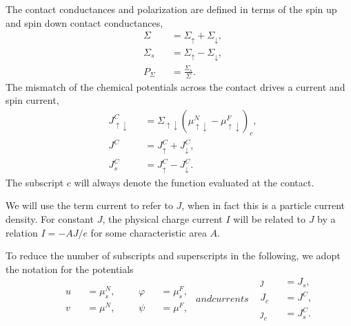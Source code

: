 The contact conductances and polarization are defined in terms
of the spin up and spin down contact conductances,
\begin{subequations}
  \label{eq:contact_conductances}
  \begin{alignat}{2}
    & Σ   && = Σ_↑ + Σ_↓ , \\
    & Σ_s && = Σ_↑ - Σ_↓ , \\
    & P_Σ && = \frac{Σ_s}{Σ} .
  \end{alignat}
\end{subequations}
The mismatch of the chemical potentials across the contact
drives a current and spin current,
\begin{subequations}
  \label{eq:contact_currents}
  \begin{alignat}{2}
    & J_{↑↓}^C && = Σ_{↑↓} \left( μ^N_{↑↓} - μ^F_{↑↓} \right)_c , \\
    & J^C      && = J_↑^C + J_↓^C , \\
    & J_s^C    && = J_↑^C - J_↓^C .
  \end{alignat}
\end{subequations}
The subscript $c$ will always denote the function evaluated at the contact.

We will use the term current to refer to $J$, when in fact this is a particle current density.
For constant $J$, the physical charge current $I$ will be related to $J$ by a relation $I = - A J / e$ for some characteristic area $A$.

To reduce the number of subscripts and superscripts in the following,
we adopt the notation for the potentials
\begin{subequations}
  \begin{equation}
    \begin{aligned}
    & \begin{alignedat}{2}
        & u && = μ^N_s , \\
        & v && = μ^N   ,
      \end{alignedat}
    & \begin{alignedat}{2}
        & φ && = μ^F_s , \\
        & ψ && = μ^F   ,
      \end{alignedat}
    \end{aligned}
  \end{equation}
  and currents
  \begin{equation}
    \begin{alignedat}{2}
      & ȷ   && = J_s     , \\
      & J_c && = J^C     , \\
      & ȷ_c && = J_s^C   .
    \end{alignedat}
  \end{equation}
\end{subequations}

